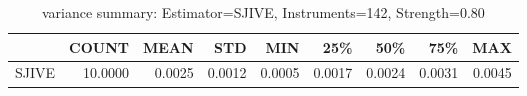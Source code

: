 \begin{table}[ht]
\centering
\caption{variance summary: Estimator=SJIVE, Instruments=142, Strength=0.80}
\begin{tabular}{lrrrrrrrr}
\toprule
 & COUNT & MEAN & STD & MIN & 25\% & 50\% & 75\% & MAX \\
\midrule
SJIVE & 10.0000 & 0.0025 & 0.0012 & 0.0005 & 0.0017 & 0.0024 & 0.0031 & 0.0045 \\
\bottomrule
\end{tabular}
\end{table}
